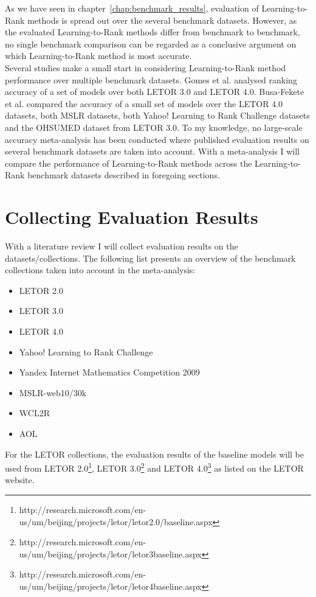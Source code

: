 As we have seen in chapter~\ref{chap:benchmark_results}, evaluation of Learning-to-Rank methods is spread out over the several benchmark datasets. However, as the evaluated Learning-to-Rank methods differ from benchmark to benchmark, no single benchmark comparison can be regarded as a conclusive argument on which Learning-to-Rank method is most accurate.\\

Several studies make a small start in considering Learning-to-Rank method performance over multiple benchmark datasets. Gomes et al. \cite{Gomes2013} analysed ranking accuracy of a set of models over both LETOR 3.0 and LETOR 4.0. Busa-Fekete et al. \cite{Busa-Fekete2013} compared the accuracy of a small set of models over the LETOR 4.0 datasets, both MSLR datasets, both Yahoo! Learning to Rank Challenge datasets and the OHSUMED dataset from LETOR 3.0. To my knowledge, no large-scale accuracy meta-analysis has been conducted where published evaluation results on several benchmark datasets are taken into account. With a meta-analysis I will compare the performance of Learning-to-Rank methods across the Learning-to-Rank benchmark datasets described in foregoing sections.

\section{Collecting Evaluation Results}
With a literature review I will collect evaluation results on the datasets/collections. The following list presents an overview of the benchmark collections taken into account in the meta-analysis:
\begin{itemize}
\item LETOR 2.0
\item LETOR 3.0
\item LETOR 4.0
\item Yahoo! Learning to Rank Challenge
\item Yandex Internet Mathematics Competition 2009
\item MSLR-web10/30k
\item WCL2R
\item AOL
\end{itemize}

For the LETOR collections, the evaluation results of the baseline models will be used from LETOR 2.0\footnote{http://research.microsoft.com/en-us/um/beijing/projects/letor/letor2.0/baseline.aspx}, LETOR 3.0\footnote{http://research.microsoft.com/en-us/um/beijing/projects/letor/letor3baseline.aspx} and LETOR 4.0\footnote{http://research.microsoft.com/en-us/um/beijing/projects/letor/letor4baseline.aspx} as listed on the LETOR website.\\

